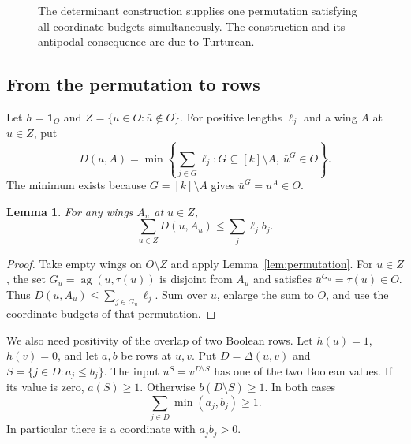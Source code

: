 \documentclass[11pt,reqno]{amsart}
\newtheorem{lemma}[theorem]{Lemma}
\theoremstyle{definition}
\theoremstyle{remark}
\newcommand{\one}{\mathbf 1}
\newcommand{\ag}{\operatorname{ag}}
\numberwithin{equation}{section}
\begin{document}
\begin{figure}[tb]
\centering
{}
\caption{The determinant construction supplies one permutation satisfying
all coordinate budgets simultaneously. The construction and its
antipodal consequence are due to Turturean.}
\end{figure}

\subsection{From the permutation to rows}

Let $h=\one_O$ and $Z=\{u\in O:\bar u\notin O\}$.
For positive lengths $\ell_j$ and a wing $A$ at $u\in Z$, put
\[
 D(u,A)=\min\left\{\sum_{j\in G}\ell_j:
              G\subseteq[k]\setminus A,\ \bar u^{G}\in O\right\}.
\]
The minimum exists because $G=[k]\setminus A$ gives
$\bar u^G=u^A\in O$.

\begin{lemma}\label{lem:wing-budget}
For any wings $A_u$ at $u\in Z$,
\[
 \sum_{u\in Z}D(u,A_u)\le\sum_j\ell_j b_j.
\]
\end{lemma}

\begin{proof}
Take empty wings on $O\setminus Z$ and apply
Lemma~\ref{lem:permutation}. For $u\in Z$, the set
$G_u=\ag(u,\tau(u))$ is disjoint from $A_u$ and satisfies
$\bar u^{G_u}=\tau(u)\in O$. Thus
$D(u,A_u)\le\sum_{j\in G_u}\ell_j$.
Sum over $u$, enlarge the sum to $O$, and use the coordinate budgets
of that permutation.
\end{proof}

We also need positivity of the overlap of two Boolean rows.
Let $h(u)=1$, $h(v)=0$, and let $a,b$ be rows at $u,v$.
Put $D=\Delta(u,v)$ and $S=\{j\in D:a_j\le b_j\}$.
The input $u^S=v^{D\setminus S}$ has one of the two Boolean values.
If its value is zero, $a(S)\ge1$. Otherwise $b(D\setminus S)\ge1$.
In both cases
\begin{equation}\label{eq:overlap}
 \sum_{j\in D}\min(a_j,b_j)\ge1.
\end{equation}
In particular there is a coordinate with $a_jb_j>0$.
\end{document}
